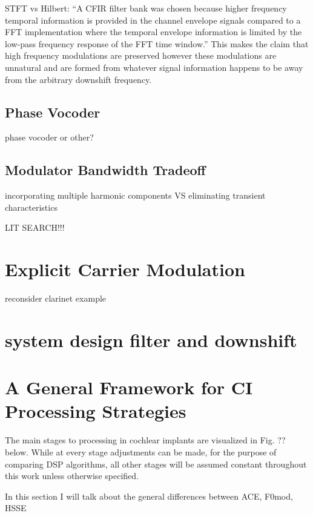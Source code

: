\documentclass [11pt, proquest] {uwthesis}[2015/03/03]
\begin{document}
STFT vs Hilbert:
``A CFIR filter bank was chosen because higher frequency temporal information is provided in the channel envelope signals compared to a FFT implementation where the temporal envelope information is limited by the low-pass frequency response of the FFT time window.'' %
This makes the claim that high frequency modulations are preserved however these modulations are unnatural and are formed from whatever signal information happens to be away from the arbitrary downshift frequency.

\subsection{Phase Vocoder}

phase vocoder or other?

\subsection{Modulator Bandwidth Tradeoff}

incorporating multiple harmonic components VS eliminating transient characteristics


LIT SEARCH!!!


\section{Explicit Carrier Modulation}

reconsider clarinet example

\section{system design filter and downshift}


\section{A General Framework for CI Processing Strategies}





The main stages to processing in cochlear implants are visualized in Fig. ?? below.  While at every stage adjustments can be made, for the purpose of comparing DSP algorithms, all other stages will be assumed constant throughout this work unless otherwise specified.

In this section I will talk about the general differences between ACE, F0mod, HSSE
\end{document}
